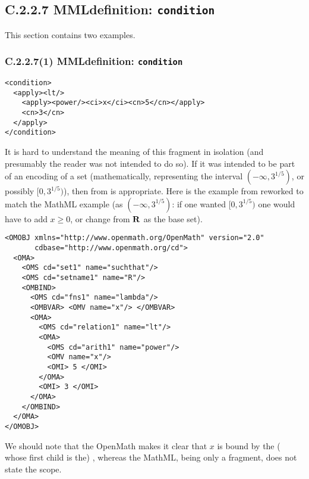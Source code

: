 \documentclass{llncs}
\begin{document}
{\subsection{C.2.2.7 MMLdefinition: {\tt condition}}
This section contains two examples.
\subsubsection{C.2.2.7(1) MMLdefinition: {\tt condition}}\label{C2271}
\begin{lstlisting}[language=MathML2]
<condition>
  <apply><lt/>
    <apply><power/><ci>x</ci><cn>5</cn></apply>
    <cn>3</cn>
  </apply>
</condition>
\end{lstlisting}
It is hard to understand the meaning of this fragment in isolation (and
presumably the reader was not intended to do so). If it was intended to be
part of an encoding of a set (mathematically, representing the interval
$(-\infty,3^{1/5})$, or possibly $[0,3^{1/5})$), then {} from
{} is appropriate. Here is the example from {} reworked to
match the MathML example (as $(-\infty,3^{1/5})$: if one wanted $[0,3^{1/5})$
one would have to add $x\ge0$, or change from $\bf R$ as the base set).
\begin{lstlisting}
<OMOBJ xmlns="http://www.openmath.org/OpenMath" version="2.0"
       cdbase="http://www.openmath.org/cd">
  <OMA>
    <OMS cd="set1" name="suchthat"/>
    <OMS cd="setname1" name="R"/>
    <OMBIND>
      <OMS cd="fns1" name="lambda"/>
      <OMBVAR> <OMV name="x"/> </OMBVAR>
      <OMA>
        <OMS cd="relation1" name="lt"/>
        <OMA>
          <OMS cd="arith1" name="power"/>
          <OMV name="x"/>
          <OMI> 5 </OMI>
        </OMA>
        <OMI> 3 </OMI>
      </OMA>
    </OMBIND>
  </OMA>
</OMOBJ>
\end{lstlisting}
We should note that the OpenMath makes it clear that $x$ is bound by the
({} whose first child is the)
{}, whereas the MathML, being only a fragment, does not state the
scope.
}
\end{document}
